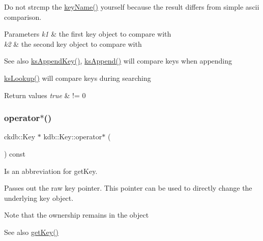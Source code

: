 Do not strcmp the \hyperlink{group__keyname_ga8e805c726a60da921d3736cda7813513}{key\+Name()} yourself because the result differs from simple ascii comparison.


\begin{DoxyParams}{Parameters}
{\em k1} & the first key object to compare with \\
\hline
{\em k2} & the second key object to compare with\\
\hline
\end{DoxyParams}
\begin{DoxySeeAlso}{See also}
\hyperlink{group__keyset_gaa5a1d467a4d71041edce68ea7748ce45}{ks\+Append\+Key()}, \hyperlink{group__keyset_ga21eb9c3a14a604ee3a8bdc779232e7b7}{ks\+Append()} will compare keys when appending 

\hyperlink{group__keyset_gaa34fc43a081e6b01e4120daa6c112004}{ks\+Lookup()} will compare keys during searching
\end{DoxySeeAlso}

\begin{DoxyRetVals}{Return values}
{\em true} & != 0 \\
\hline
\end{DoxyRetVals}
\mbox{\label{classkdb_1_1Key_a66e5af2387ebb86efa465ba2e844cafd}} 
\subsubsection{\texorpdfstring{operator$\ast$()}{operator*()}}
{\footnotesize\ttfamily ckdb\+::\+Key $\ast$ kdb\+::\+Key\+::operator$\ast$ (\begin{DoxyParamCaption}{ }\end{DoxyParamCaption}) const\hspace{0.3cm}{\ttfamily [inline]}}



Is an abbreviation for get\+Key. 

Passes out the raw key pointer. This pointer can be used to directly change the underlying key object.

\begin{DoxyNote}{Note}
that the ownership remains in the object
\end{DoxyNote}
\begin{DoxySeeAlso}{See also}
\hyperlink{classkdb_1_1Key_a6be9b3bb17434fd4362d137183d51100}{get\+Key()} 
\end{DoxySeeAlso}
\mbox{\label{classkdb_1_1Key_a1e3c8da218a6a6e9f832f70772bcdc6f}} 
